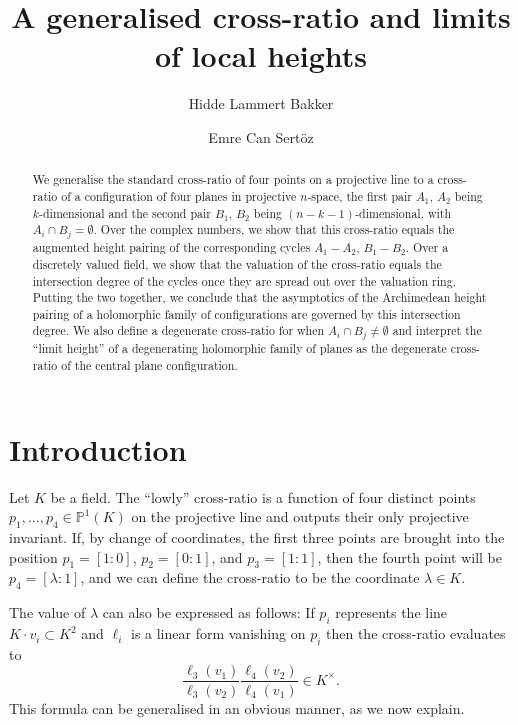 \documentclass[11pt,a4paper]{amsart}
\author[H.~L.~Bakker]{Hidde Lammert Bakker}
\author[E.~C.~Sertöz]{Emre Can Sertöz}
\title[Generalised cross-ratio]{A generalised cross-ratio and limits of local heights}
\newcommand{\p}{\mathbb{P}^1}
\theoremstyle{plain}
\theoremstyle{definition}
\theoremstyle{remark}
\begin{document}
\begin{abstract}
We generalise the standard cross-ratio of four points on a projective line to a cross-ratio of a configuration of four planes in projective $n$-space, the first pair $A_1,\,A_2$ being $k$-dimensional and the second pair $B_1,\, B_2$ being $(n-k-1)$-dimensional, with $A_i \cap B_j = \emptyset$. Over the complex numbers, we show that this cross-ratio equals the augmented height pairing of the corresponding cycles $A_1-A_2, \, B_1-B_2$. Over a discretely valued field, we show that the valuation of the cross-ratio equals the intersection degree of the cycles once they are spread out over the valuation ring. Putting the two together, we conclude that the asymptotics of the Archimedean height pairing of a holomorphic family of configurations are governed by this intersection degree. We also define a degenerate cross-ratio for when $A_i \cap B_j \neq \emptyset$ and interpret the ``limit height'' of a degenerating holomorphic family of planes as the degenerate cross-ratio of the central plane configuration.
\end{abstract}

\maketitle


\section{Introduction}

Let $K$ be a field. The ``lowly'' cross-ratio \cite[p.651]{Vakil2003} is a function of four distinct points $p_1,\dots,p_4 \in \p(K)$ on the projective line and outputs their only projective invariant. 
If, by change of coordinates, the first three points are brought into the position $p_1=[1:0]$, $p_2=[0:1]$, and $p_3=[1:1]$, then the fourth point will be $p_4 = [\lambda:1]$, and we can define the cross-ratio to be the coordinate $\lambda \in K$. 

The value of $\lambda$ can also be expressed as follows: 
If $p_i$ represents the line $K \cdot v_i \subset K^2$ and $\ell_i$ is a linear form vanishing on $p_i$ then the cross-ratio evaluates to
\begin{equation}\label{eq:classical}
 \frac{\ell_3(v_1)}{\ell_3(v_2)}\frac{\ell_4(v_2)}{\ell_4(v_1)} \in K^\times.
\end{equation}
This formula can be generalised in an obvious manner, as we now explain.
\end{document}
